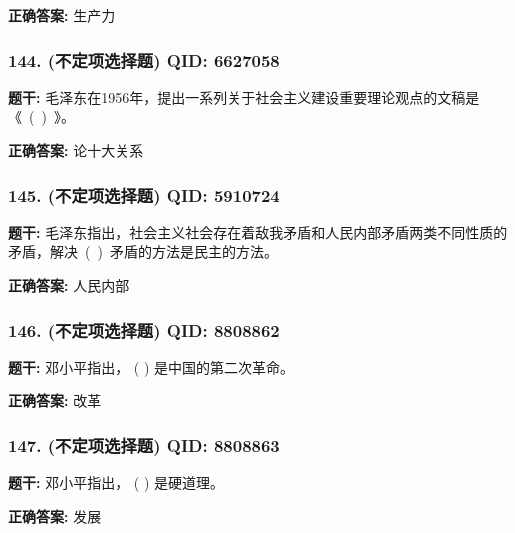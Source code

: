 \documentclass[12pt,UTF8]{ctexart}
\begin{document}
\textbf{正确答案:}
生产力

\vspace{0.3em}\hrulefill\vspace{0.7em}

\subsubsection*{144. (不定项选择题) \small QID: 6627058}

\textbf{题干:}
毛泽东在1956年，提出一系列关于社会主义建设重要理论观点的文稿是《 ( ) 》。

\textbf{正确答案:}
论十大关系

\vspace{0.3em}\hrulefill\vspace{0.7em}

\subsubsection*{145. (不定项选择题) \small QID: 5910724}

\textbf{题干:}
毛泽东指出，社会主义社会存在着敌我矛盾和人民内部矛盾两类不同性质的矛盾，解决 ( ) 矛盾的方法是民主的方法。

\textbf{正确答案:}
人民内部

\vspace{0.3em}\hrulefill\vspace{0.7em}

\subsubsection*{146. (不定项选择题) \small QID: 8808862}

\textbf{题干:}
邓小平指出， ( ) 是中国的第二次革命。

\textbf{正确答案:}
改革

\vspace{0.3em}\hrulefill\vspace{0.7em}

\subsubsection*{147. (不定项选择题) \small QID: 8808863}

\textbf{题干:}
邓小平指出， ( ) 是硬道理。

\textbf{正确答案:}
发展

\vspace{0.3em}\hrulefill\vspace{0.7em}
\end{document}
